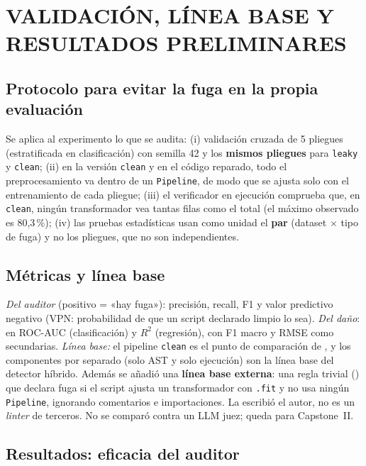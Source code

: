 
\chapter{VALIDACIÓN, LÍNEA BASE Y RESULTADOS PRELIMINARES}
\label{ch:validacion}

\section{Protocolo para evitar la fuga en la propia evaluación}

Se aplica al experimento lo que se audita: (i) validación cruzada de 5 pliegues (estratificada en clasificación) con semilla 42 y los \textbf{mismos pliegues} para \texttt{leaky} y \texttt{clean}; (ii) en la versión \texttt{clean} y en el código reparado, todo el preprocesamiento va dentro de un \texttt{Pipeline}, de modo que se ajusta solo con el entrenamiento de cada pliegue; (iii) el verificador en ejecución comprueba que, en \texttt{clean}, ningún transformador vea tantas filas como el total (el máximo observado es 80,3\,\%); (iv) las pruebas estadísticas usan como unidad el \textbf{par} (dataset $\times$ tipo de fuga) y no los pliegues, que no son independientes.

\section{Métricas y línea base}

\emph{Del auditor} (positivo = «hay fuga»): precisión, recall, F1 y valor predictivo negativo (VPN: probabilidad de que un script declarado limpio lo sea). \emph{Del daño}: \DOpt{} en ROC-AUC (clasificación) y $R^2$ (regresión), con F1 macro y RMSE como secundarias. \emph{Línea base:} el pipeline \texttt{clean} es el punto de comparación de \DOpt, y los componentes por separado (solo AST y solo ejecución) son la línea base del detector híbrido. Además se añadió una \textbf{línea base externa}: una regla trivial () que declara fuga si el script ajusta un transformador con \texttt{.fit} y no usa ningún \texttt{Pipeline}, ignorando comentarios e importaciones. La escribió el autor, no es un \emph{linter} de terceros. No se comparó contra un LLM juez; queda para Capstone~II.

\section{Resultados: eficacia del auditor}
\label{sec:eficacia}


